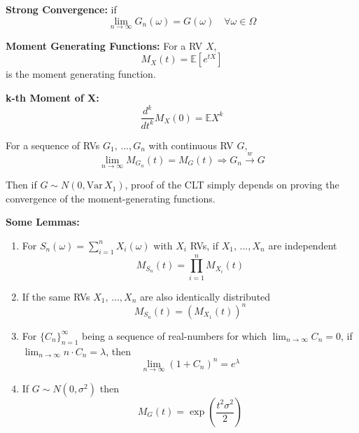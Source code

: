 \documentclass[12pt]{article}
\newcommand{\E}{\mathbb{E}}
\newcommand{\Var}{\text{Var}\,}
\begin{document}
\textbf{Strong Convergence:} if 
\[\lim_{n \to \infty} G_n(\omega) = G(\omega) \quad \forall \omega \in \Omega\]

\textbf{Moment Generating Functions:} For a RV $X$, 
\[M_X(t) = \E[e^{tX}]\]
is the moment generating function. 

\textbf{k-th Moment of X:} 
\[\frac{d^k}{dt^k} M_X(0) = \E X^k\]

For a sequence of RVs $G_1, \, ..., G_n$ with continuous RV $G$,  
\[\lim_{n\to \infty} M_{G_n}(t) = M_G(t) \Longrightarrow G_n \overset{w}{\to} G\]

Then if $G \sim N(0, \Var X_1)$, proof of the CLT simply depends on proving the convergence of the moment-generating functions. 

\textbf{Some Lemmas:}
\begin{enumerate}
    \item For $S_n(\omega) = \sum_{i=1}^n X_i(\omega)$ with $X_i$ RVs, if $X_1, \, ..., X_n$ are independent 
    \[M_{S_n}(t) = \prod_{i=1}^n M_{X_i}(t)\]
    \item If the same RVs $X_1,\, ..., X_n$ are also identically distributed 
    \[M_{S_n}(t) = (M_{X_1}(t))^n\]
    \item For $\{C_n\}_{n=1}^\infty$ being a sequence of real-numbers for which $\lim_{n\to\infty} C_n = 0$, if $\lim_{n\to\infty} n\cdot C_n = \lambda$, then 
    \[\lim_{n\to\infty} (1 + C_n)^n = e^{\lambda}\]
    \item If $G \sim N(0, \sigma^2)$ then 
    \[M_G(t) = \exp(\frac{t^2 \sigma^2}{2})\]
\end{enumerate}
\end{document}
